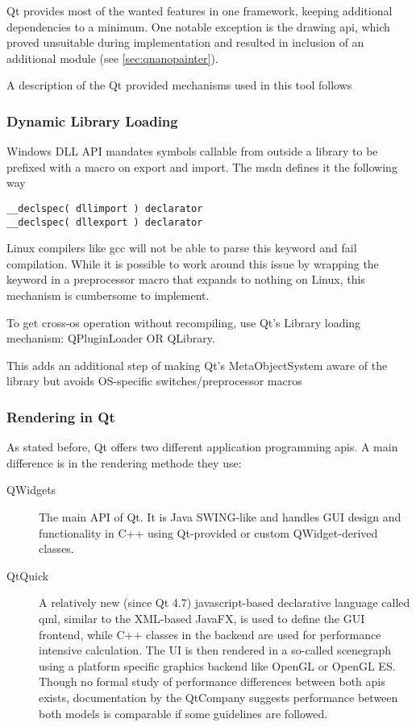 Qt provides most of the wanted features in one framework, keeping additional dependencies to a minimum. One notable exception is the drawing \gls{api}, which proved unsuitable during implementation and resulted in inclusion of an additional module (see \ref{sec:qnanopainter}). 

A description of the Qt provided mechanisms used in this tool follows

\subsubsection{Dynamic Library Loading}
Windows DLL API mandates symbols callable from outside a library to be prefixed with a macro on export and import. The \gls{msdn} defines it the following way
\begin{lstlisting}
__declspec( dllimport ) declarator  
__declspec( dllexport ) declarator  
\end{lstlisting}

Linux compilers like gcc will not be able to parse this keyword and fail compilation. While it is possible to work around this issue by wrapping the keyword in a preprocessor macro that expands to nothing on Linux, this mechanism is cumbersome to implement.

To get cross-\gls{os} operation without recompiling, use Qt's Library loading mechanism: QPluginLoader OR QLibrary.

This adds an additional step of making Qt's MetaObjectSystem aware of the library but avoids OS-specific switches/preprocessor macros

\subsubsection{Rendering in Qt}
As stated before, Qt offers two different application programming \gls{api}s. A main difference is in the rendering methode they use:
\begin{description}
	\item [QWidgets] The main API of Qt. It is Java SWING-like and handles GUI design and functionality in C++ using Qt-provided or custom QWidget-derived classes.
	\item [QtQuick] A relatively new (since Qt 4.7) javascript-based declarative language called \gls{qml}, similar to the XML-based JavaFX, is used to define the GUI frontend, while C++ classes in the backend are used for performance intensive calculation. The UI is then rendered in a so-called scenegraph using a platform specific graphics backend like OpenGL or OpenGL ES. Though no formal study of performance differences between both \gls{api}s exists, documentation by the QtCompany suggests performance between both models is comparable if some guidelines are followed.
\end{description}

